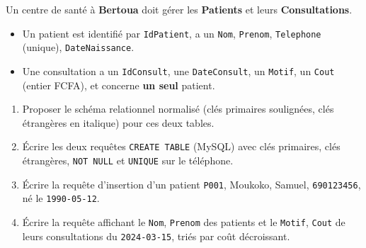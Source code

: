 \documentclass[11pt]{article}
\begin{document}
\begin{exercice}
Un centre de santé à \textbf{Bertoua} doit gérer les \textbf{Patients} et leurs \textbf{Consultations}.
\begin{itemize}
    \item Un patient est identifié par \texttt{IdPatient}, a un \texttt{Nom}, \texttt{Prenom}, \texttt{Telephone} (unique), \texttt{DateNaissance}.
    \item Une consultation a un \texttt{IdConsult}, une \texttt{DateConsult}, un \texttt{Motif}, un \texttt{Cout} (entier FCFA), et concerne \textbf{un seul} patient.
\end{itemize}
\begin{enumerate}
    \item Proposer le schéma relationnel normalisé (clés primaires soulignées, clés étrangères en italique) pour ces deux tables.
    \item Écrire les deux requêtes \texttt{CREATE TABLE} (MySQL) avec clés primaires, clés étrangères, \texttt{NOT NULL} et \texttt{UNIQUE} sur le téléphone.
    \item Écrire la requête d'insertion d'un patient \texttt{P001}, \og{}Moukoko\fg{}, \og{}Samuel\fg{}, \texttt{690123456}, né le \texttt{1990-05-12}.
    \item Écrire la requête affichant le \texttt{Nom}, \texttt{Prenom} des patients et le \texttt{Motif}, \texttt{Cout} de leurs consultations du \texttt{2024-03-15}, triés par coût décroissant.
\end{enumerate}
\end{exercice}
\end{document}
